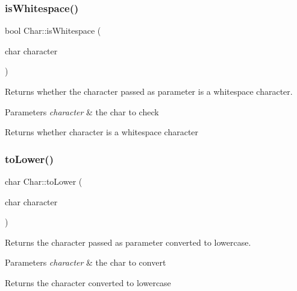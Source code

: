 \subsubsection{\texorpdfstring{isWhitespace()}{isWhitespace()}}
{\footnotesize\ttfamily bool Char\+::is\+Whitespace (\begin{DoxyParamCaption}\item[{char}]{character }\end{DoxyParamCaption})\hspace{0.3cm}{\ttfamily [inline]}}



Returns whether the character passed as parameter is a whitespace character. 


\begin{DoxyParams}{Parameters}
{\em character} & the char to check \\
\hline
\end{DoxyParams}
\begin{DoxyReturn}{Returns}
whether character is a whitespace character 
\end{DoxyReturn}
\mbox{\label{namespace_char_a5a333d969ad1891cace57ea5facce42e}} 
\subsubsection{\texorpdfstring{toLower()}{toLower()}}
{\footnotesize\ttfamily char Char\+::to\+Lower (\begin{DoxyParamCaption}\item[{char}]{character }\end{DoxyParamCaption})\hspace{0.3cm}{\ttfamily [inline]}}



Returns the character passed as parameter converted to lowercase. 


\begin{DoxyParams}{Parameters}
{\em character} & the char to convert \\
\hline
\end{DoxyParams}
\begin{DoxyReturn}{Returns}
the character converted to lowercase 
\end{DoxyReturn}
\mbox{\label{namespace_char_a0b800fb7a4523ba2c0e7e00edd42e345}} 

